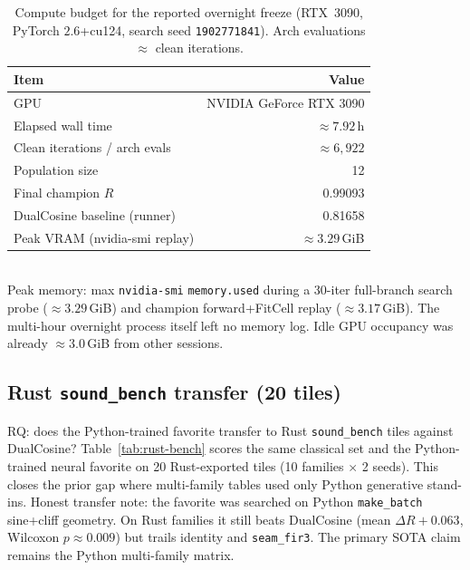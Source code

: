 \begin{table}[t]
  \centering
  \caption{Compute budget for the reported overnight freeze (RTX~3090, PyTorch $2.6$+cu124, search seed \texttt{1902771841}). Arch evaluations $\approx$ clean iterations.}
  \label{tab:compute}
  \setlength{\tabcolsep}{3pt}
  \begin{tabular}{@{}lr@{}}
    \toprule
    Item & Value \\
    \midrule
    GPU & NVIDIA GeForce RTX 3090 \\
    Elapsed wall time & $\approx 7.92$\,h \\
    Clean iterations / arch evals & $\approx 6{,}922$ \\
    Population size & 12 \\
    Final champion $R$ & 0.99093 \\
    DualCosine baseline (runner) & 0.81658 \\
    Peak VRAM (nvidia-smi replay) & $\approx 3.29$\,GiB \\
    \bottomrule
  \end{tabular}\\[0.4em]
  {\footnotesize Peak memory: max \texttt{nvidia-smi} \texttt{memory.used} during a 30-iter full-branch search probe ($\approx 3.29$\,GiB) and champion forward{+}FitCell replay ($\approx 3.17$\,GiB). The multi-hour overnight process itself left no memory log. Idle GPU occupancy was already $\approx 3.0$\,GiB from other sessions.}
\end{table}

\subsection{Rust \texttt{sound\_bench} transfer (20 tiles)}
\label{sec:rust-bench}

RQ: does the Python-trained favorite transfer to Rust \texttt{sound\_bench} tiles against DualCosine?
Table~\ref{tab:rust-bench} scores the same classical set and the Python-trained neural favorite on 20 Rust-exported tiles (10 families $\times$ 2 seeds).
This closes the prior gap where multi-family tables used only Python generative stand-ins.
Honest transfer note: the favorite was searched on Python \texttt{make\_batch} sine{+}cliff geometry. On Rust families it still beats DualCosine (mean $\Delta R{+}0.063$, Wilcoxon $p{\approx}0.009$) but trails identity and \texttt{seam\_fir3}. The primary SOTA claim remains the Python multi-family matrix.

